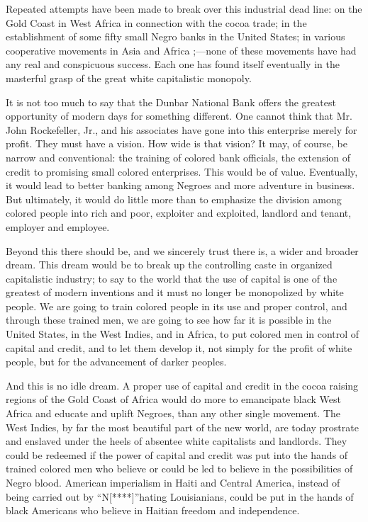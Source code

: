 \documentclass[letterpaper,10pt,english]{jupyterBook}
\begin{document}
\sphinxAtStartPar
Repeated attempts have been made to break over this industrial dead line: on the Gold Coast in West Africa in connection with the cocoa trade; in the establishment of some fifty small Negro banks in the United States; in various co\sphinxhyphen{}operative movements in Asia and Africa ;—none of these movements have had any real and conspicuous success. Each one has found itself eventually in the masterful grasp of the great white capitalistic monopoly.

\sphinxAtStartPar
It is not too much to say that the Dunbar National Bank offers the greatest opportunity of modern days for something different. One cannot think that Mr. John Rockefeller, Jr., and his associates have gone into this enterprise merely for profit. They must have a vision. How wide is that vision? It may, of course, be narrow and conventional: the training of colored bank officials, the extension of credit to promising small colored enterprises. This would be of value. Eventually, it would lead to better banking among Negroes and more adventure in business. But ultimately, it would do little more than to emphasize the division among colored people into rich and poor, exploiter and exploited, landlord and tenant, employer and employee.

\sphinxAtStartPar
Beyond this there should be, and we sincerely trust there is, a wider and broader dream. This dream would be to break up the controlling caste in organized capitalistic industry; to say to the world that the use of capital is one of the greatest of modern inventions and it must no longer be monopolized by white people. We are going to train colored people in its use and proper control, and through these trained men, we are going to see how far it is possible in the United States, in the West Indies, and in Africa, to put colored men in control of capital and credit, and to let them develop it, not simply for the profit of white people, but for the advancement of darker peoples.

\sphinxAtStartPar
And this is no idle dream. A proper use of capital and credit in the cocoa raising regions of the Gold Coast of Africa would do more to emancipate black West Africa and educate and uplift Negroes, than any other single movement. The West Indies, by far the most beautiful part of the new world, are today prostrate and enslaved under the heels of absentee white capitalists and landlords. They could be redeemed if the power of capital and credit was put into the hands of trained colored men who believe or could be led to believe in the possibilities of Negro blood. American imperialism in Haiti and Central America, instead of being carried out by “N{[}****{]}”\sphinxhyphen{}hating Louisianians, could be put in the hands of black Americans who believe in Haitian freedom and independence.
\end{document}
